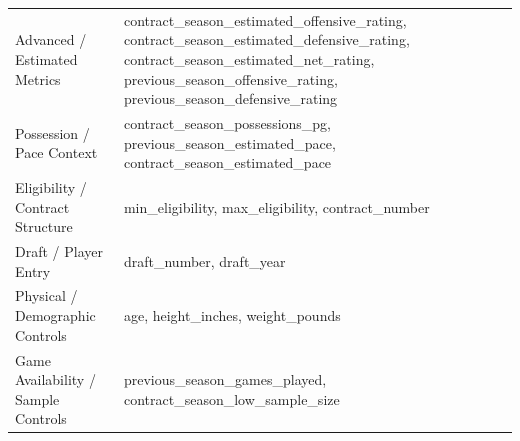 \documentclass[conference]{IEEEtran}
\begin{document}
\begin{table}[ht]
\begin{tabular}{p{4cm} p{10cm}}
        Advanced / Estimated Metrics        &
        contract\_season\_estimated\_offensive\_rating, contract\_season\_estimated\_defensive\_rating, contract\_season\_estimated\_net\_rating, previous\_season\_offensive\_rating, previous\_season\_defensive\_rating \\

        Possession / Pace Context           &
        contract\_season\_possessions\_pg, previous\_season\_estimated\_pace, contract\_season\_estimated\_pace                                                                                                            \\

        Eligibility / Contract Structure    &
        min\_eligibility, max\_eligibility, contract\_number                                                                                                                                                               \\

        Draft / Player Entry                &
        draft\_number, draft\_year                                                                                                                                                                                         \\

        Physical / Demographic Controls     &
        age, height\_inches, weight\_pounds                                                                                                                                                                                \\

        Game Availability / Sample Controls &
        previous\_season\_games\_played, contract\_season\_low\_sample\_size                                                                                                                                               \\

        \bottomrule
    \end{tabular}
\end{table}



\end{document}

